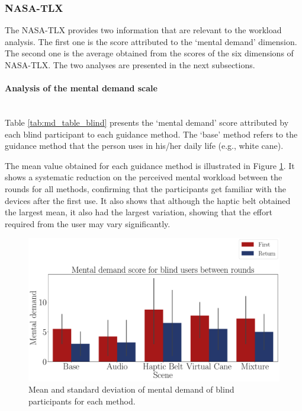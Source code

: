 \subsubsection{NASA-TLX}
\label{subsubsec:results_nasa_tlx_1}

The NASA-TLX provides two information that are relevant to the workload analysis. The first one is the score attributed to the ‘mental demand’ dimension. The second one is the average obtained from the scores of the six dimensions of NASA-TLX. The two analyses are presented in the next subsections.

\paragraph{Analysis of the mental demand scale}\mbox{}\\

Table \ref{tab:md_table_blind} presents the ‘mental demand’ score attributed by each blind participant to each guidance method. The ‘base’ method refers to the guidance method that the person uses in his/her daily life (e.g., white cane). 



The mean value obtained for each guidance method is illustrated in Figure \ref{fig:barplot_md_avg_5_scene_blind}. It shows a systematic reduction on the perceived mental workload between the rounds for all methods, confirming that the participants get familiar with the devices after the first use. It also shows that although the haptic belt obtained the largest mean, it also had the largest variation, showing that the effort required from the user may vary significantly.

\begin{figure}[!htb]
    \centering
    \includegraphics[width = \textwidth]{Resultados/Nasa/Figuras/pdf/barplot_md_avg_5_scene_blind.pdf}
    \caption{Mean and standard deviation of mental demand of blind participants for each method.}
    \label{fig:barplot_md_avg_5_scene_blind}
\end{figure}


